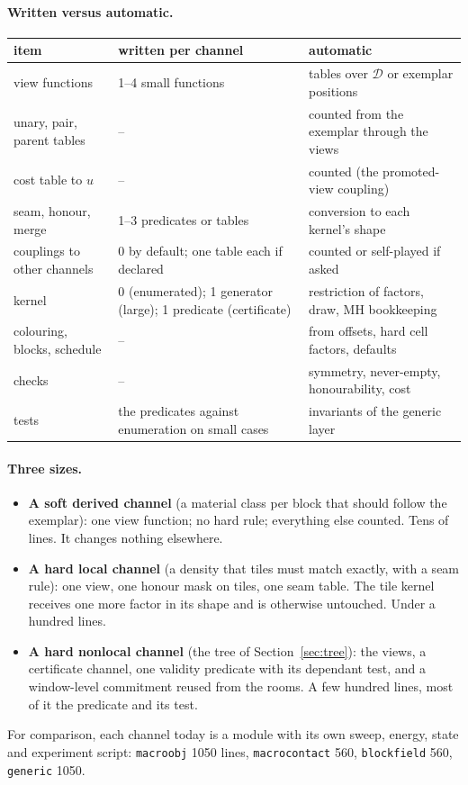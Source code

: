 \documentclass[11pt]{article}
\newcommand{\1}{\mathds{1}}
\newcommand{\Dom}{\mathcal{D}}
\begin{document}
\paragraph{Written versus automatic.}
\begin{center}
\small
\begin{tabular}{@{}lp{2.2in}p{2.2in}@{}}
\toprule
item & written per channel & automatic \\
\midrule
view functions & 1--4 small functions & tables over $\Dom$ or exemplar positions \\
unary, pair, parent tables & -- & counted from the exemplar through the views \\
cost table to $u$ & -- & counted (the promoted-view coupling) \\
seam, honour, merge & 1--3 predicates or tables & conversion to each kernel's shape \\
couplings to other channels & 0 by default; one table each if declared & counted or self-played if asked \\
kernel & 0 (enumerated); 1 generator (large); 1 predicate (certificate) & restriction of factors, draw, MH bookkeeping \\
colouring, blocks, schedule & -- & from offsets, hard cell factors, defaults \\
checks & -- & symmetry, never-empty, honourability, cost \\
tests & the predicates against enumeration on small cases & invariants of the generic layer \\
\bottomrule
\end{tabular}
\end{center}

\paragraph{Three sizes.}
\begin{itemize}
  \item \textbf{A soft derived channel} (a material class per block that should
        follow the exemplar): one view function; no hard rule; everything else
        counted. Tens of lines. It changes nothing elsewhere.
  \item \textbf{A hard local channel} (a density that tiles must match exactly, with
        a seam rule): one view, one honour mask on tiles, one seam table. The
        tile kernel receives one more factor in its shape and is otherwise
        untouched. Under a hundred lines.
  \item \textbf{A hard nonlocal channel} (the tree of Section~\ref{sec:tree}): the
        views, a certificate channel, one validity predicate with its dependant
        test, and a window-level commitment reused from the rooms. A few
        hundred lines, most of it the predicate and its test.
\end{itemize}
For comparison, each channel today is a module with its own sweep, energy,
state and experiment script: \texttt{macroobj} 1050 lines, \texttt{macrocontact}
560, \texttt{blockfield} 560, \texttt{generic} 1050.
\end{document}

